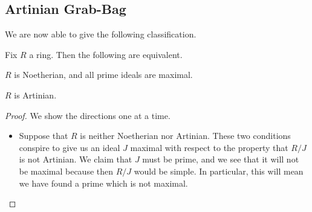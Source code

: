 \subsection{Artinian Grab-Bag}
We are now able to give the following classification.
\begin{theorem}
	Fix $R$ a ring. Then the following are equivalent.
	\begin{listalph}
		\item $R$ is Noetherian, and all prime ideals are maximal.
		\item $R$ is Artinian.
	\end{listalph}
\end{theorem}
\begin{proof}
	We show the directions one at a time.
	\begin{itemize}
		\item Suppose that $R$ is neither Noetherian nor Artinian. These two conditions conspire to give us an ideal $J$ maximal with respect to the property that $R/J$ is not Artinian. We claim that $J$ must be prime, and we see that it will not be maximal because then $R/J$ would be simple. In particular, this will mean we have found a prime which is not maximal.


\end{itemize}
\end{proof}
